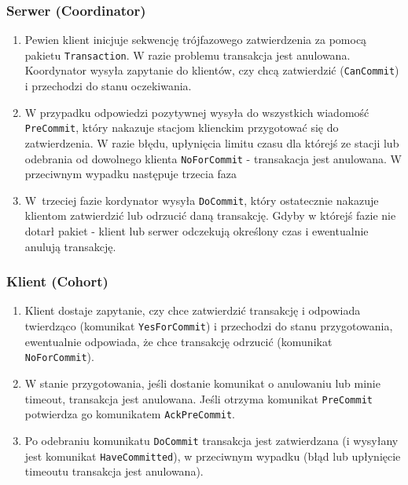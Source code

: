 \documentclass[a4paper, oneside, 11pt]{report}
\begin{document}
\subsubsection{Serwer (Coordinator)}
\begin{enumerate}
	\item Pewien klient inicjuje sekwencję trójfazowego zatwierdzenia za pomocą pakietu \verb+Transaction+. W razie problemu transakcja jest anulowana. Koordynator wysyła zapytanie do klientów, czy chcą zatwierdzić (\verb+CanCommit+) i przechodzi do stanu oczekiwania. 
	\item W przypadku odpowiedzi pozytywnej wysyła do wszystkich wiadomość \verb+PreCommit+, który nakazuje stacjom klienckim przygotować się do zatwierdzenia. W razie błędu, upłynięcia limitu czasu dla którejś ze stacji lub odebrania od dowolnego klienta \verb+NoForCommit+ - transakacja jest anulowana. W przeciwnym wypadku następuje trzecia faza
	\item W~trzeciej fazie kordynator wysyła \verb+DoCommit+, który ostatecznie nakazuje klientom zatwierdzić lub odrzucić daną transakcję. Gdyby w którejś fazie nie dotarł pakiet - klient lub serwer odczekują określony czas i ewentualnie anulują transakcję.
\end{enumerate}
\subsubsection{Klient (Cohort)}
\begin{enumerate}
	\item Klient dostaje zapytanie, czy chce zatwierdzić transakcję i odpowiada twierdząco (komunikat \verb+YesForCommit+) i przechodzi do stanu przygotowania, ewentualnie odpowiada, że chce transakcję odrzucić (komunikat \verb+NoForCommit+).
	\item W stanie przygotowania, jeśli dostanie komunikat o anulowaniu lub minie timeout, transakcja jest anulowana. Jeśli otrzyma komunikat \verb+PreCommit+ potwierdza go komunikatem \verb+AckPreCommit+.
	\item Po odebraniu komunikatu \verb+DoCommit+ transakcja jest zatwierdzana (i wysyłany jest komunikat \verb+HaveCommitted+), w przeciwnym wypadku (błąd lub upłynięcie timeoutu transakcja jest anulowana).
\end{enumerate}
\end{document}
